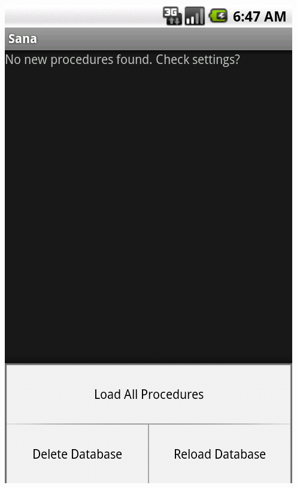 \documentclass[a4paper,10pt]{article}
\begin{document}
\includegraphics[scale=0.2,keepaspectratio=true]{client_settings_procedures_load.png}
\end{document}
